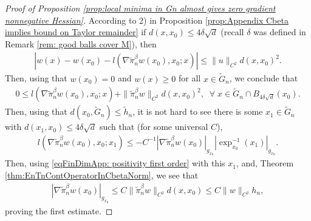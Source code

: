 \documentclass[11pt,reqno]{amsart}
\numberwithin{equation}{section}
\theoremstyle{plain}
\begin{document}
\begin{proof}[Proof of Proposition \ref{prop:local minima in Gn almost gives zero gradient nonnegative Hessian}]

  According to 2) in Proposition \ref{prop:Appendix Cbeta implies bound on Taylor remainder} if $d(x,x_0) \leq 4\delta\sqrt{d}$ (recall $\delta$ was defined in Remark \ref{rem: good balls cover M}), then
  \begin{align*}
    |w(x)-w(x_0)-l(\nabla \tilde \pi_n^\beta w(x_0),x_0;x)|\leq \|u\|_{C^2}d(x,x_0)^2. 
  \end{align*}	
  Then, using that $w(x_0)=0$ and $w(x)\geq 0$ for all $x\in \tilde G_n$, we conclude that
  \begin{align}\label{eqFinDimApp: positivity first order}
    0\leq l(\nabla \tilde \pi_n^\beta w(x_0),x_0;x)+\|\tilde \pi_n^\beta w\|_{C^2}d(x,x_0)^2,\;\;\forall\;x\in \tilde G_n \cap B_{4\delta \sqrt{d}}(x_0).
  \end{align}	
  Then, using that $d(x_0,\tilde G_n)\leq \tilde h_n$, it is not hard to see there is some  $x_1 \in \tilde G_n$ with $d(x_1,x_0)\leq 4\delta\sqrt{d}$ such that (for some universal $C$),
  \begin{align*}
    l(\nabla \tilde \pi_n^\beta w(x_0),x_0;x_1)\leq -C^{-1}|\nabla \tilde \pi_n^\beta w(x_0)|_{g_{x_0}}|\exp_{x_0}^{-1}(x_1)|_{g_{x_0}}.
  \end{align*}
  Then, using \eqref{eqFinDimApp: positivity first order} with this $x_1$, and, Theorem \ref{thm:EnTnContOperatorInCbetaNorm}, we see that
  \begin{align*}
    |\nabla \tilde \pi_n^\beta w(x_0)|_{g_{x_0}} \leq C\|\tilde \pi_n^\beta w\|_{C^2}d(x,x_0)\leq C\|w\|_{C^2}h_n,
  \end{align*}
  proving the first estimate. 
  

\end{proof}
\end{document}
